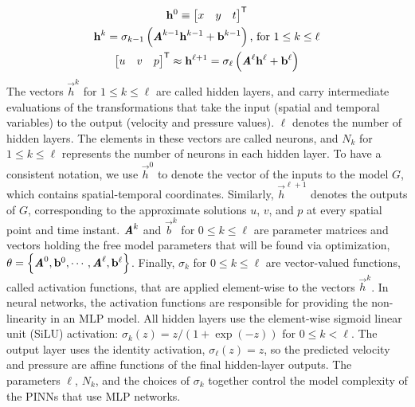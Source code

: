 \begin{gather}\label{eq:mlp-formula}
    \mathbf{h}^0 \equiv \begin{bmatrix} x & y & t \end{bmatrix}^\mathsf{T} \\
    \mathbf{h}^k =
        \sigma_{k-1}\left(\boldsymbol{\mathit{A}}^{k-1}\mathbf{h}^{k-1}+\mathbf{b}^{k-1}\right)
        \text{, for } 1 \le k \le \ell \\
    \begin{bmatrix} u & v & p \end{bmatrix}^\mathsf{T}
        \approx
        \mathbf{h}^{\ell+1} = \sigma_\ell\left(\boldsymbol{\mathit{A}}^\ell\mathbf{h}^\ell+\mathbf{b}^\ell\right)
\end{gather}
The vectors $\vec{h}^k$ for $1 \le k \le \ell$ are called hidden layers, and carry intermediate evaluations of the transformations that take the input (spatial and temporal variables) to the output (velocity and pressure values).
$\ell$ denotes the number of hidden layers.
The elements in these vectors are called neurons, and $N_k$ for $1 \le k \le \ell$ represents the number of neurons in each hidden layer.
To have a consistent notation, we use $\vec{h}^0$ to denote the vector of the inputs to the model $G$, which contains spatial-temporal coordinates.
Similarly, $\vec{h}^{\ell+1}$ denotes the outputs of $G$, corresponding to the approximate solutions $u$, $v$, and $p$ at every spatial point and time instant. 
$\boldsymbol{\mathit{A}}^k$ and $\vec{b}^k$ for $0 \le k \le \ell$ are parameter matrices and vectors holding the free model parameters that will be found via optimization, 
$\theta = \left\{ \boldsymbol{\mathit{A}}^0, \mathbf{b}^0, \cdots, \boldsymbol{\mathit{A}}^\ell, \mathbf{b}^\ell\right\}$.
Finally, $\sigma_k$ for $0 \le k \le \ell$ are vector-valued functions, called activation functions, that are applied element-wise to the vectors $\vec{h}^k$.
In neural networks, the activation functions are responsible for providing the non-linearity in an MLP model.
All hidden layers use the element-wise sigmoid linear unit (SiLU) activation: $\sigma_k(z)=z/(1+\exp(-z))$ for $0 \leq k < \ell$.
The output layer uses the identity activation, $\sigma_\ell(z)=z$, so the predicted velocity and pressure are affine functions of the final hidden-layer outputs.
The parameters $\ell$, $N_k$, and the choices of $\sigma_k$ together control the model complexity of the PINNs that use MLP networks.

